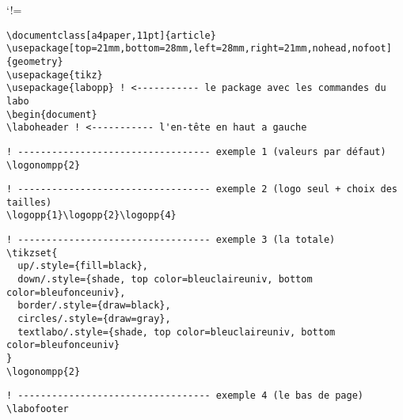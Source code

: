 \documentclass[a4paper,11pt]{article}
\begin{document}
\laboheader

\def\CommentChar{\char37}
\catcode`!=\active
\begin{Verbatim}[defineactive=\def!{\color{orange}\CommentChar}]
\documentclass[a4paper,11pt]{article}
\usepackage[top=21mm,bottom=28mm,left=28mm,right=21mm,nohead,nofoot]{geometry}
\usepackage{tikz}
\usepackage{labopp} ! <----------- le package avec les commandes du labo
\begin{document}
\laboheader ! <----------- l'en-tête en haut a gauche
\end{Verbatim}


\begin{Verbatim}[defineactive=\def!{\color{orange}\CommentChar}]
! ---------------------------------- exemple 1 (valeurs par défaut)
\logonompp{2}
\end{Verbatim}

\begin{Verbatim}[defineactive=\def!{\color{orange}\CommentChar}]
! ---------------------------------- exemple 2 (logo seul + choix des tailles)
\logopp{1}\logopp{2}\logopp{4}
\end{Verbatim}


\begin{Verbatim}[defineactive=\def!{\color{orange}\CommentChar}]
! ---------------------------------- exemple 3 (la totale)
\tikzset{
  up/.style={fill=black},
  down/.style={shade, top color=bleuclaireuniv, bottom color=bleufonceuniv},
  border/.style={draw=black},
  circles/.style={draw=gray},
  textlabo/.style={shade, top color=bleuclaireuniv, bottom color=bleufonceuniv}
}
\logonompp{2}
\end{Verbatim}
{ %
}



\vfill

\begin{Verbatim}[defineactive=\def!{\color{orange}\CommentChar}]
! ---------------------------------- exemple 4 (le bas de page)
\labofooter
\end{Verbatim}
\labofooter
\end{document}
